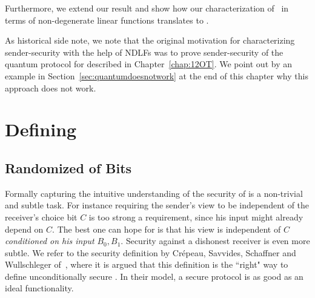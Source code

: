 Furthermore, we extend our result and show how our characterization of
\RandOT\ in terms of non-degenerate linear functions translates
to \onenOT. 

\vspace{2mm}
As historical side note, we note that the original motivation for
characterizing sender-security with the help of NDLFs was to prove
sender-security of the quantum protocol for \OT described in
Chapter~\ref{chap:12OT}. We point out by an example in
Section~\ref{sec:quantumdoesnotwork} at the end of this
chapter why this approach does not work.


\section{Defining \OT}\label{sec:Definition}

\subsection{Randomized \OT of Bits}

Formally capturing the intuitive understanding of the security of \OT 
is a non-trivial and subtle task.  For instance requiring the sender's
view to be independent of the receiver's choice bit $C$ is too strong
a requirement, since his input might already depend on $C$. The best
one can hope for is that his view is independent of $C$ {\em
  conditioned on his input} $B_0,B_1$. Security against a dishonest
receiver is even more subtle.
We refer to the security definition by Cr\'epeau, Savvides, Schaffner and
Wullschleger of~\cite{CSSW06}, where it is argued that this definition
is the ``right" way to define unconditionally secure \OT. In their
model, a secure \OT protocol is as good as 
an ideal \OT functionality.



